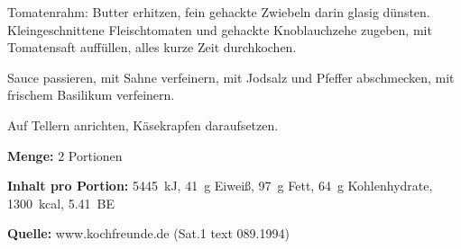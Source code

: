 {Tomatenrahm: Butter erhitzen, fein gehackte Zwiebeln darin glasig
dünsten. Kleingeschnittene Fleischtomaten und gehackte Knoblauchzehe zugeben, mit Tomatensaft auffüllen, alles kurze Zeit durchkochen.

Sauce passieren, mit Sahne verfeinern, mit Jodsalz und Pfeffer abschmecken, mit frischem Basilikum verfeinern.

Auf Tellern anrichten, Käsekrapfen daraufsetzen.


{\bfseries Menge:} 2 Portionen

{\bfseries Inhalt pro Portion:} 5445~kJ, 41~g Eiweiß, 97~g Fett, 64~g Kohlenhydrate, 1300~kcal, 5.41~BE

{\bfseries Quelle:} www.kochfreunde.de (Sat.1 text 089.1994) 

} 

